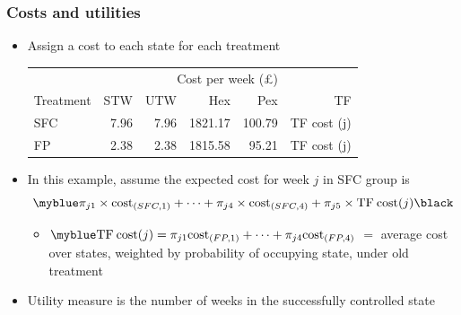 
\begin{frame}

\frametitle{Costs and utilities}
\begin{itemize}
\item Assign a cost to each state for each treatment
\begin{center}
\begin{tabular}{l|rrrrr} \\ \hline
&\multicolumn{5}{c}{Cost per week (\pounds)} \\
Treatment&STW&UTW&Hex&Pex&TF\\ \hline
SFC & 7.96 & 7.96 & 1821.17 & 100.79 & TF cost (j)\\
FP  & 2.38 & 2.38 & 1815.58 &  95.21 & TF cost (j)\\ \hline
\end{tabular}
\end{center}

\vspace{7pt}
\item In this example, assume the expected cost for week $j$ in SFC group is
$$\myblue \pi_{j1}\times\mathrm{cost}_{(SFC,1)}+\cdots + \pi_{j4}\times\mathrm{cost}_{(SFC,4)}+ \pi_{j5}\times\mbox{TF\:cost}(j) \vspace{-6pt}  \black$$
\begin{itemize}
\item $\displaystyle \myblue \mbox{TF\:cost}(j) = \pi_{j1}\mathrm{cost}_{(FP,1)}+ \cdots + \pi_{j4} \mathrm{cost}_{(FP,4)}$ $=$ average cost over states, weighted by probability of occupying state, under old treatment
\end{itemize}
\vspace{7pt}
\item Utility measure is the number of weeks in the successfully controlled state
\end{itemize}
\end{frame}


